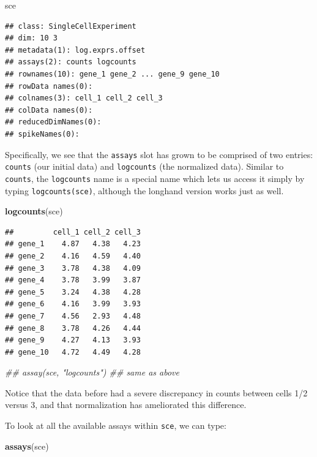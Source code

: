 \documentclass[]{book}
\newenvironment{Shaded}{\begin{snugshade}}{\end{snugshade}}
\newcommand{\CommentTok}[1]{\textcolor[rgb]{0.56,0.35,0.01}{\textit{#1}}}
\newcommand{\KeywordTok}[1]{\textcolor[rgb]{0.13,0.29,0.53}{\textbf{#1}}}
\newcommand{\NormalTok}[1]{#1}
\begin{document}
\begin{Shaded}
\begin{Highlighting}[]
\NormalTok{sce}
\end{Highlighting}
\end{Shaded}

\begin{verbatim}
## class: SingleCellExperiment 
## dim: 10 3 
## metadata(1): log.exprs.offset
## assays(2): counts logcounts
## rownames(10): gene_1 gene_2 ... gene_9 gene_10
## rowData names(0):
## colnames(3): cell_1 cell_2 cell_3
## colData names(0):
## reducedDimNames(0):
## spikeNames(0):
\end{verbatim}

Specifically, we see that the \texttt{assays} slot has grown to be comprised of two entries: \texttt{counts} (our initial data) and \texttt{logcounts} (the normalized data). Similar to \texttt{counts}, the \texttt{logcounts} name is a special name which lets us access it simply by typing \texttt{logcounts(sce)}, although the longhand version works just as well.

\begin{Shaded}
\begin{Highlighting}[]
\KeywordTok{logcounts}\NormalTok{(sce)}
\end{Highlighting}
\end{Shaded}

\begin{verbatim}
##         cell_1 cell_2 cell_3
## gene_1    4.87   4.38   4.23
## gene_2    4.16   4.59   4.40
## gene_3    3.78   4.38   4.09
## gene_4    3.78   3.99   3.87
## gene_5    3.24   4.38   4.28
## gene_6    4.16   3.99   3.93
## gene_7    4.56   2.93   4.48
## gene_8    3.78   4.26   4.44
## gene_9    4.27   4.13   3.93
## gene_10   4.72   4.49   4.28
\end{verbatim}

\begin{Shaded}
\begin{Highlighting}[]
\CommentTok{## assay(sce, "logcounts") ## same as above}
\end{Highlighting}
\end{Shaded}

Notice that the data before had a severe discrepancy in counts between cells 1/2 versus 3, and that normalization has ameliorated this difference.

To look at all the available assays within \texttt{sce}, we can type:

\begin{Shaded}
\begin{Highlighting}[]
\KeywordTok{assays}\NormalTok{(sce)}
\end{Highlighting}
\end{Shaded}
\end{document}
